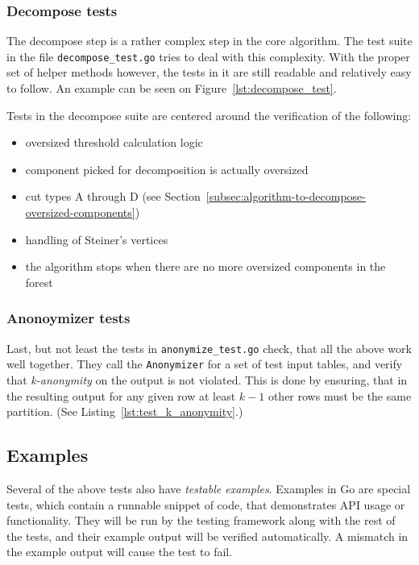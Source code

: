 \subsubsection{Decompose tests}
The decompose step is a rather complex step in the core algorithm. The test suite in the file \texttt{decompose\_test.go} tries to deal with this complexity. With the proper set of helper methods however, the tests in it are still readable and relatively easy to follow. An example can be seen on Figure~\ref{lst:decompose_test}.

Tests in the decompose suite are centered around the verification of the following:
\begin{itemize}
    \item oversized threshold calculation logic
    \item component picked for decomposition is actually oversized
    \item cut types A through D (see Section~\ref{subsec:algorithm-to-decompose-oversized-components})
    \item handling of Steiner's vertices
    \item the algorithm stops when there are no more oversized components in the forest
\end{itemize}



\subsubsection{Anonoymizer tests}
Last, but not least the tests in \texttt{anonymize\_test.go} check, that all the above work well together. They call the \texttt{Anonymizer} for a set of test input tables, and verify that \emph{k-anonymity} on the output is not violated. This is done by ensuring, that in the resulting output for any given row at least \(k-1\) other rows must be the same partition. (See Listing~\ref{lst:test_k_anonymity}.)



\subsection{Examples}
Several of the above tests also have \emph{testable examples}. Examples in Go are special tests, which contain a runnable snippet of code, that demonstrates API usage or functionality. They will be run by the testing framework along with the rest of the tests, and their example output will be verified automatically. A mismatch in the example output will cause the test to fail.

